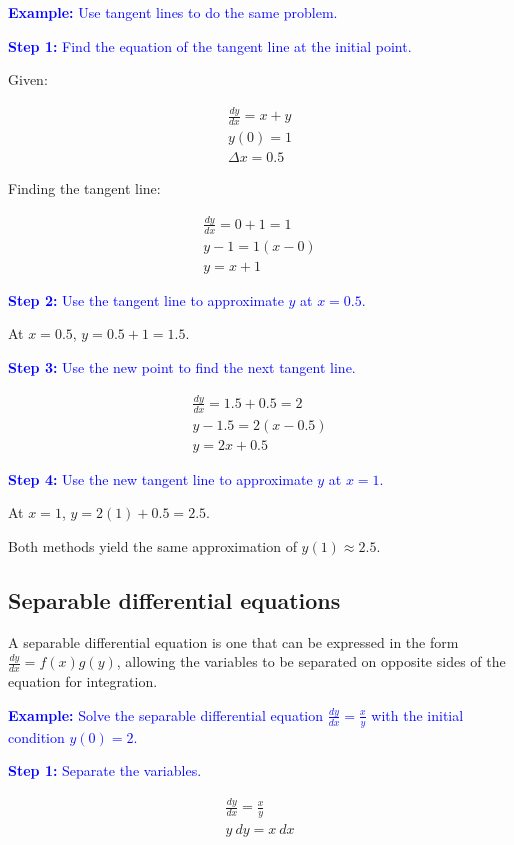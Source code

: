 \documentclass[letterpaper, 12pt]{article}
\newcommand{\example}[1]{\textcolor{blue}{\textbf{Example:} #1}}
\newcommand{\step}[2]{\textcolor{blue}{\textbf{Step #1:} #2}}
\begin{document}
\example{Use tangent lines to do the same problem.}

\step{1}{Find the equation of the tangent line at the initial point.}

Given:

\begin{gather*}
\frac{dy}{dx} = x + y \\
y(0) = 1 \\
\Delta x = 0.5
\end{gather*}

Finding the tangent line:

\begin{gather*}
\frac{dy}{dx} = 0 + 1 = 1 \\
y - 1 = 1(x - 0) \\
y = x + 1
\end{gather*}

\step{2}{Use the tangent line to approximate $y$ at $x=0.5$.}

At $x=0.5$, $y = 0.5 + 1 = 1.5$.

\step{3}{Use the new point to find the next tangent line.}

\begin{gather*}
\frac{dy}{dx} = 1.5 + 0.5 = 2 \\
y - 1.5 = 2(x-0.5) \\
y = 2x + 0.5
\end{gather*}

\step{4}{Use the new tangent line to approximate $y$ at $x=1$.}

At $x=1$, $y = 2(1) + 0.5 = \boxed{2.5}$.

Both methods yield the same approximation of $y(1) \approx 2.5$.

\subsection*{Separable differential equations}

A separable differential equation is one that can be expressed in the form $\frac{dy}{dx} = f(x)g(y)$, allowing the variables to be separated on opposite sides of the equation for integration.

\example{Solve the separable differential equation $\displaystyle \frac{dy}{dx} = \frac{x}{y}$ with the initial condition $y(0) = 2$.}

\step{1}{Separate the variables.}

\begin{gather*}
\frac{dy}{dx} = \frac{x}{y} \\
y \: dy = x \: dx
\end{gather*}
\end{document}
